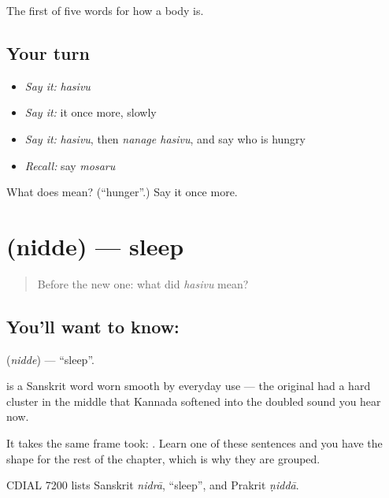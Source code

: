 \begin{grammarlens}[title={What you've built}]
The first of five words for how a body is.
\end{grammarlens}

\subsection*{Your turn}
\begin{itemize}
\raggedright
  \item \emph{Say it:} \emph{hasivu}
  \item \emph{Say it:} it once more, slowly
  \item \emph{Say it:} \emph{hasivu}, then \emph{nanage hasivu}, and say who is hungry
  \item \emph{Recall:} say \emph{mosaru}
\end{itemize}

\begin{tcolorbox}[breakable,colback=teal!4,colframe=teal!35!black,title={Before you move on}]
What does  mean? (\textquotedblleft{}hunger\textquotedblright{}.) Say it once more.
\end{tcolorbox}
\section[\texorpdfstring{\kn{ನಿದ್ದೆ} (nidde)}{ನಿದ್ದೆ (nidde)}]{ (nidde) — sleep}

\label{lesson:KA-C63-sleep}



\begin{quote}
Before the new one: what did \emph{hasivu} mean?
\end{quote}

\subsection*{You'll want to know: }
\textbf{} (\emph{nidde}) — \textquotedblleft{}sleep\textquotedblright{}.

 is a Sanskrit word worn smooth by everyday use — the original had a hard cluster in the middle that Kannada softened into the doubled sound you hear now.

It takes the same frame  took:  . Learn one of these sentences and you have the shape for the rest of the chapter, which is why they are grouped.

CDIAL 7200 lists Sanskrit \emph{nidrā}, \textquotedblleft{}sleep\textquotedblright{}, and Prakrit \emph{ṇiddā}.

